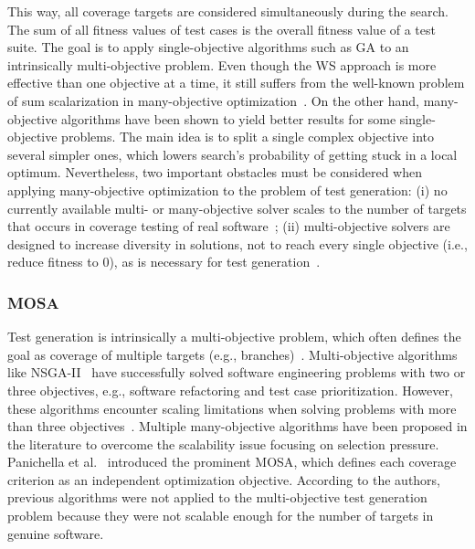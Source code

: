 \documentclass[paper=a4,%
  twoside,%
  BCOR4mm,%
  abstract=true,%
  toc=bibliography,%
  chapterprefix=true,%
  toc=bibliographynumbered,%
  open=right,%
  english,%
  pagesize=pdftex]{scrreprt}
\begin{document}
This way, all coverage targets are considered simultaneously during the search. The sum of all fitness values of test cases is the overall fitness value of a test suite. The goal is to apply single-objective algorithms such as \ac{GA} to an intrinsically multi-objective problem. Even though the \ac{WS} approach is more effective than one objective at a time, it still suffers from the well-known problem of sum scalarization in many-objective optimization~\cite{Deb2014}. On the other hand, many-objective algorithms have been shown to yield better results for some single-objective problems. The main idea is to split a single complex objective into several simpler ones, which lowers search's probability of getting stuck in a local optimum. Nevertheless, two important obstacles must be considered when applying many-objective optimization to the problem of test generation: (i) no currently available multi- or many-objective solver scales to the number of targets that occurs in coverage testing of real software~\cite{Arcuri_2014}; (ii) multi-objective solvers are designed to increase diversity in solutions, not to reach every single objective (i.e., reduce fitness to 0), as is necessary for test generation~\cite{Panichella2018}. 


\subsubsection{MOSA}
Test generation is intrinsically a multi-objective problem, which often defines the goal as coverage of multiple targets (e.g., branches)~\cite{Panichella2018}. Multi-objective algorithms like \ac{NSGA-II}~\cite{Deb_2000} have successfully solved software engineering problems with two or three objectives, e.g., software refactoring and test case prioritization. However, these algorithms encounter scaling limitations when solving problems with more than three objectives~\cite{Li2015}. Multiple many-objective algorithms have been proposed in the literature to overcome the scalability issue focusing on selection pressure. Panichella et al.~\cite{Panichella_2015} introduced the prominent \ac{MOSA}, which defines each coverage criterion as an independent optimization objective. According to the authors, previous algorithms were not applied to the multi-objective test generation problem because they were not scalable enough for the number of targets in genuine software. 
\end{document}
